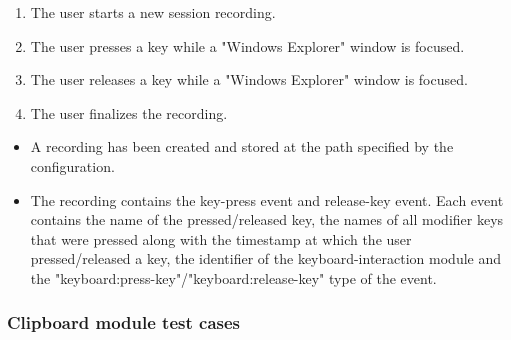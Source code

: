 \begin{tests}
	{\begin{enumerate}
		\item The \gls{user} starts a new \gls{session} recording.
		\item The \gls{user} presses a key while a "Windows Explorer" window is focused.
		\item The \gls{user} releases a key while a "Windows Explorer" window is focused.
		\item The \gls{user} finalizes the recording.
	\end{enumerate}}
	{\begin{itemize}
		\item A recording has been created and stored at the path specified by the configuration.
		\item The recording contains the key-press \gls{event} and release-key event. Each \gls{event} contains the name of the pressed/released key, the names of all modifier keys that were pressed along with the timestamp at which the \gls{user} pressed/released a key, the identifier of the keyboard-interaction module and the "keyboard:press-key"/"keyboard:release-key" type of the event.
	\end{itemize}}
\end{tests}

\subsubsection{Clipboard module test cases}
	
